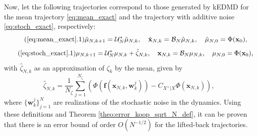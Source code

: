 \documentclass{article}
\newcommand{\U}{\mathcal{U}}
\begin{document}
Now, let the following trajectories correspond to those generated by kEDMD for the mean trajectory \eqref{eq:mean_exact} and the trajectory with additive noise \eqref{eq:stoch_exact}, respectively:
\begin{equation*}
    \label{eq:mean_app}
    \tag{\ref{eq:mean_exact}.1}
    \hat{\mu}_{N,k+1} = \U^*_N \hat{\mu}_{N,k}, \quad \hat{\mathbf{x}}_{N,k} = \mathcal{B}_N \hat{\mu}_{N,k}, \quad \hat{\mu}_{N,0} = \Phi(\mathbf{x}_0),
\end{equation*}
\begin{equation*}
    \label{eq:stoch_app}
    \tag{\ref{eq:stoch_exact}.1}
    \mu_{N,k+1} = \U^*_N \mu_{N,k} + \hat{\zeta}_{N,k}, \quad \mathbf{x}_{N,k} = \mathcal{B}_N \mu_{N,k}, \quad \mu_{N,0} = \Phi(\mathbf{x}_0),
\end{equation*}
with \( \hat{\zeta}_{N,k} \) as an approximation of \( \zeta_k \) by the mean, given by
\[
\hat{\zeta}_{N,k} = \frac{1}{N_\zeta} \sum_{j=1}^{N_\zeta} \left( \Phi(\mathbf{f}(\mathbf{x}_{N,k}, \mathbf{w}_k^j)) - C_{X^+|X} \Phi(\mathbf{x}_{N,k}) \right),
\]
where \( \{\mathbf{w}_k^j\}_{j=1}^N \) are realizations of the stochastic noise in the dynamics. Using these definitions and Theorem \ref{theo:error_koop_sqrt_N_def}, it can be proven that there is an error bound of order \( O(N^{-1/2}) \) for the lifted-back trajectories.
\end{document}
